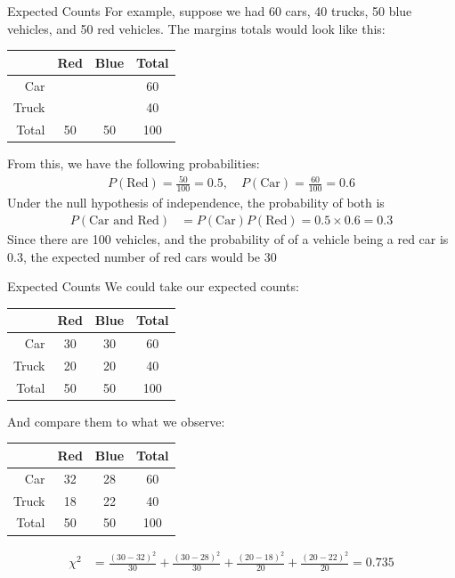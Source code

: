 \documentclass{beamer}
\begin{document}
\begin{frame}{Expected Counts}
For example, suppose we had 60 cars, 40 trucks, 50 blue vehicles, and 50 red vehicles. The margins totals would look like this:
\begin{table}[ht]
\centering
\begin{tabular}{rcc|c}
  \hline
 & Red & Blue & Total\\
  \hline
Car &  &  & 60 \\ 
Truck &  &  & 40\\ 
   \hline
Total & 50 & 50 & 100 \\ \hline
\end{tabular}
\end{table}
From this, we have the following probabilities:
\begin{align*}
P(\text{Red}) = \frac{50}{100} = 0.5, \quad P(\text{Car}) = \frac{60}{100} = 0.6
\end{align*}
Under the null hypothesis of independence, the probability of both is
\begin{align*}
P(\text{Car and Red}) &= P(\text{Car})P(\text{Red}) = 0.5 \times 0.6 = 0.3
\end{align*}
Since there are 100 vehicles, and the probability of of a vehicle being a red car is 0.3, the expected number of red cars would be 30
\end{frame}

\begin{frame}{Expected Counts}
We could take our expected counts:
\begin{table}[ht]
\centering
\begin{tabular}{rcc|c}
  \hline
 & Red & Blue & Total\\
  \hline
Car & 30 & 30 & 60 \\ 
Truck & 20 & 20 & 40\\ 
   \hline
Total & 50 & 50 & 100 \\ \hline
\end{tabular}
\end{table}
And compare them to what we observe:
\begin{table}[ht]
\centering
\begin{tabular}{rcc|c}
  \hline
 & Red & Blue & Total\\
  \hline
Car & 32 & 28 & 60 \\ 
Truck & 18 & 22 & 40\\ 
   \hline
Total & 50 & 50 & 100 \\ \hline
\end{tabular}
\end{table}
\begin{align*}
\chi^2 &=  \frac{(30-32)^2}{30} + \frac{(30-28)^2}{30}+\frac{(20-18)^2}{20} + \frac{(20-22)^2}{20} = 0.735
\end{align*}
\end{frame}
\end{document}
